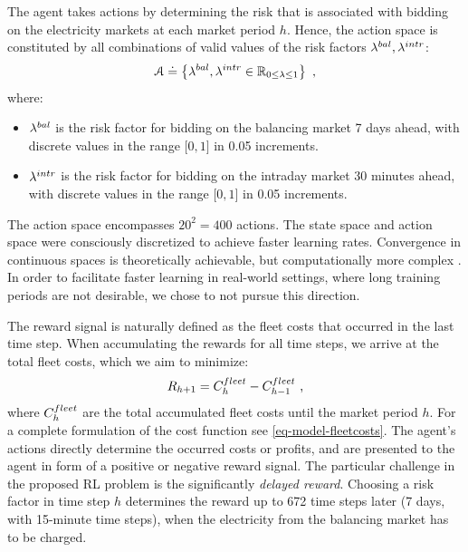 \documentclass[a4paper, 12pt]{article}
\let\cite\shortcite
\begin{document}
The agent takes actions by determining the risk that is associated with bidding
on the electricity markets at each market period \(h\). Hence, the action space is
constituted by all combinations of valid values of the risk factors
\(\lambda^{bal}_{},\lambda^{intr}_{}\):
\begin{equation}
    {\cal A} \doteq \left\{\lambda^{bal}_{},\lambda^{intr}_{} \in \mathbb{R}_{0 \leq \lambda \leq 1} \right\} \text{ ,}
\end{equation}
where:
\begin{itemize}
\item \(\lambda^{bal}_{}\) is the risk factor for bidding on the balancing market 7 days ahead,
with discrete values in the range \(\big[0,1\big]\) in 0.05 increments.
\item \(\lambda^{intr}_{}\) is the risk factor for bidding on the intraday market 30 minutes
ahead, with discrete values in the range \(\big[0,1\big]\) in 0.05 increments.
\end{itemize}
The action space encompasses \(20^2 = 400\) actions. The state space and action
space were consciously discretized to achieve faster learning rates. Convergence
in continuous spaces is theoretically achievable, but computationally more
complex \cite{sutton18_reinf}. In order to facilitate faster learning in
real-world settings, where long training periods are not desirable, we chose to
not pursue this direction.

The reward signal is naturally defined as the fleet costs that occurred in the last
time step. When accumulating the rewards for all time steps, we arrive at the total
fleet costs, which we aim to minimize:
\begin{equation}
    R_{h+1} = C^{fleet}_{h} - C^{fleet}_{h-1} \text{ ,}
\end{equation}
where \(C^{fleet}_{h}\) are the total accumulated fleet costs until the market period
\(h\). For a complete formulation of the cost function see
\eqref{eq-model-fleetcosts}. The agent's actions directly determine the occurred
costs or profits, and are presented to the agent in form of a positive or
negative reward signal. The particular challenge in the proposed RL problem is
the significantly \emph{delayed reward}. Choosing a risk factor in time step \(h\)
determines the reward up to 672 time steps later (7 days, with 15-minute time
steps), when the electricity from the balancing market has to be charged.
\end{document}
